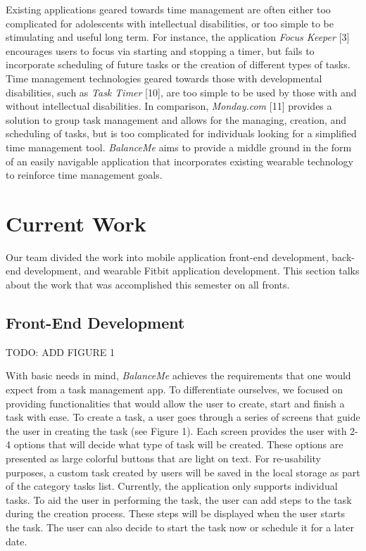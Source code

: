 \documentclass{sigchi}
\begin{document}
Existing applications geared towards time management are often either too
complicated for adolescents with intellectual disabilities, or too simple to be
stimulating and useful long term. For instance, the application
\textit{Focus Keeper} [3] encourages users to focus via starting and stopping a
timer, but fails to incorporate scheduling of future tasks or the creation of
different types of tasks. Time management technologies geared towards those with
developmental disabilities, such as \textit{Task Timer} [10], are too simple to
be used by those with and without intellectual disabilities. In comparison,
\textit{Monday.com} [11] provides a solution to group task management and
allows for the managing, creation, and scheduling of tasks, but is too
complicated for individuals looking for a simplified time management tool.
\textit{BalanceMe} aims to provide a middle ground in the form of an easily
navigable application that incorporates existing wearable technology to
reinforce time management goals.


\section{Current Work}

Our team divided the work into mobile application front-end development,
back-end development, and wearable Fitbit application development. This section
talks about the work that was accomplished this semester on all fronts.


\subsection{Front-End Development}

TODO: ADD FIGURE 1


With basic needs in mind, \textit{BalanceMe} achieves the requirements that one
would expect from a task management app. To differentiate ourselves, we focused
on providing functionalities that would allow the user to create, start and
finish a task with ease. To create a task, a user goes through a series of
screens that guide the user in creating the task (see Figure 1). Each screen
provides the user with 2-4 options that will decide what type of task will be
created. These options are presented as large colorful buttons that are light
on text. For re-usability purposes, a custom task created by users will be
saved in the local storage as part of the category tasks list. Currently, the
application only supports individual tasks. To aid the user in performing the
task, the user can add steps to the task during the creation process. These
steps will be displayed when the user starts the task. The user can also decide
to start the task now or schedule it for a later date.
\end{document}
